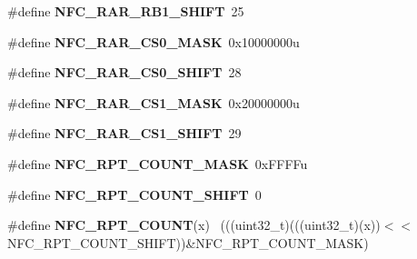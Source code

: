 \begin{DoxyCompactItemize}
\item 
\hypertarget{group___n_f_c___register___masks_ga86eba0a30df0eb06206647097ce32e9d}{}\#define {\bfseries N\+F\+C\+\_\+\+R\+A\+R\+\_\+\+R\+B1\+\_\+\+S\+H\+I\+F\+T}~25\label{group___n_f_c___register___masks_ga86eba0a30df0eb06206647097ce32e9d}

\item 
\hypertarget{group___n_f_c___register___masks_ga206a23e693d0f90b70c4d3b47a9d1bdb}{}\#define {\bfseries N\+F\+C\+\_\+\+R\+A\+R\+\_\+\+C\+S0\+\_\+\+M\+A\+S\+K}~0x10000000u\label{group___n_f_c___register___masks_ga206a23e693d0f90b70c4d3b47a9d1bdb}

\item 
\hypertarget{group___n_f_c___register___masks_ga8bfbdbe9995fcc676dd2ab69155abba9}{}\#define {\bfseries N\+F\+C\+\_\+\+R\+A\+R\+\_\+\+C\+S0\+\_\+\+S\+H\+I\+F\+T}~28\label{group___n_f_c___register___masks_ga8bfbdbe9995fcc676dd2ab69155abba9}

\item 
\hypertarget{group___n_f_c___register___masks_gab6512f94d5cd8e0604df97cedc43ce52}{}\#define {\bfseries N\+F\+C\+\_\+\+R\+A\+R\+\_\+\+C\+S1\+\_\+\+M\+A\+S\+K}~0x20000000u\label{group___n_f_c___register___masks_gab6512f94d5cd8e0604df97cedc43ce52}

\item 
\hypertarget{group___n_f_c___register___masks_gaf2caaf2a5288fd5aa9b1510a4cbd244f}{}\#define {\bfseries N\+F\+C\+\_\+\+R\+A\+R\+\_\+\+C\+S1\+\_\+\+S\+H\+I\+F\+T}~29\label{group___n_f_c___register___masks_gaf2caaf2a5288fd5aa9b1510a4cbd244f}

\item 
\hypertarget{group___n_f_c___register___masks_gaee0bd7fed69c60081c2615579974e284}{}\#define {\bfseries N\+F\+C\+\_\+\+R\+P\+T\+\_\+\+C\+O\+U\+N\+T\+\_\+\+M\+A\+S\+K}~0x\+F\+F\+F\+Fu\label{group___n_f_c___register___masks_gaee0bd7fed69c60081c2615579974e284}

\item 
\hypertarget{group___n_f_c___register___masks_ga0b413c1a5682e418ef89c64142c1cdcd}{}\#define {\bfseries N\+F\+C\+\_\+\+R\+P\+T\+\_\+\+C\+O\+U\+N\+T\+\_\+\+S\+H\+I\+F\+T}~0\label{group___n_f_c___register___masks_ga0b413c1a5682e418ef89c64142c1cdcd}

\item 
\hypertarget{group___n_f_c___register___masks_ga3d6f9f83241ce459f163932b277cce34}{}\#define {\bfseries N\+F\+C\+\_\+\+R\+P\+T\+\_\+\+C\+O\+U\+N\+T}(x)                                              ~(((uint32\+\_\+t)(((uint32\+\_\+t)(x))$<$$<$N\+F\+C\+\_\+\+R\+P\+T\+\_\+\+C\+O\+U\+N\+T\+\_\+\+S\+H\+I\+F\+T))\&N\+F\+C\+\_\+\+R\+P\+T\+\_\+\+C\+O\+U\+N\+T\+\_\+\+M\+A\+S\+K)\label{group___n_f_c___register___masks_ga3d6f9f83241ce459f163932b277cce34}


\end{DoxyCompactItemize}
